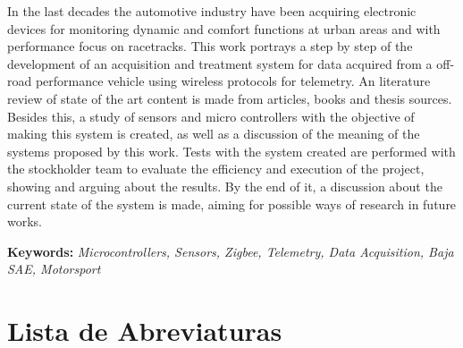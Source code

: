 \noindent In the last decades the automotive industry have been acquiring electronic devices for monitoring dynamic and comfort functions at urban areas and with performance focus on racetracks. This work portrays a step by step of the development of an acquisition and treatment system for data acquired from a off-road performance vehicle using wireless protocols for telemetry. An literature review of state of the art content is made from articles, books and thesis sources. Besides this, a study of sensors and micro controllers with the objective of making this system is created, as well as a discussion of the meaning of the systems proposed by this work. Tests with the system created are performed with the stockholder team to evaluate the efficiency and execution of the project, showing and arguing about the results. By the end of it, a discussion about the current state of the system is made, aiming for possible ways of research in future works.        



\noindent \textbf{Keywords:} \textit{Microcontrollers, Sensors, Zigbee, Telemetry, Data Acquisition, Baja SAE, Motorsport} 

\tableofcontents
\listoffigures
\listoftables
\newpage
\chapter*{Lista de Abreviaturas\hfill} 
\listofsymbols

\newpage
\pagestyle{myheadings}
